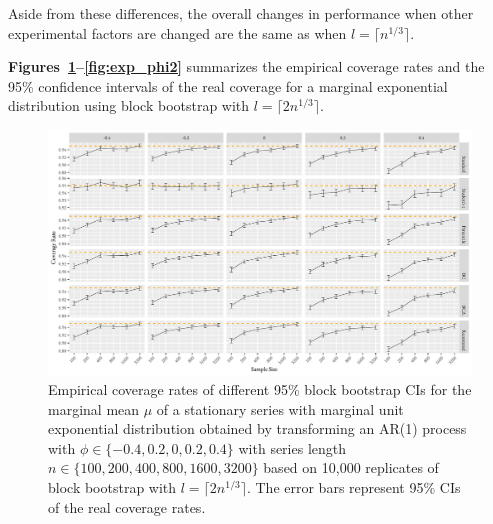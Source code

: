 \documentclass[10pt]{article}
\begin{document}
Aside from these differences, the overall changes
in performance when other experimental factors are changed are the same as
when $l = \lceil n^{1/3} \rceil$.

\textbf{Figures~\ref{fig:exp_mu2}--\ref{fig:exp_phi2}} 
summarizes the empirical coverage rates and the 95\% confidence intervals of the 
real coverage for a marginal exponential distribution using block bootstrap
with $l = \lceil 2n^{1/3} \rceil$.

\begin{figure}[tbp]
  \centering
  \includegraphics[width=\textwidth]{figures/plot_exp_mu_2}
  \caption{Empirical coverage rates of different 95\% block bootstrap CIs for
    the marginal mean $\mu$ of a stationary series with marginal unit exponential
    distribution obtained by transforming an AR(1) process with
    $\phi \in \{-0.4, 0.2, 0, 0.2, 0.4\}$ with series length
    $n \in \{100, 200, 400, 800, 1600, 3200\}$ based on 10,000 replicates of
    block bootstrap with $l = \lceil 2n^{1/3} \rceil$. 
    The error bars represent 95\% CIs of the real coverage rates.}
  \label{fig:exp_mu2}
\end{figure}
\end{document}
